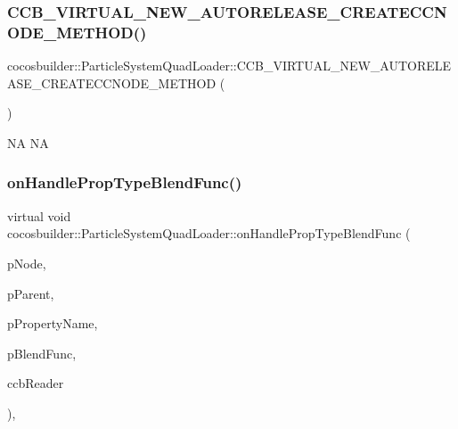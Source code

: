\subsubsection{\texorpdfstring{C\+C\+B\+\_\+\+V\+I\+R\+T\+U\+A\+L\+\_\+\+N\+E\+W\+\_\+\+A\+U\+T\+O\+R\+E\+L\+E\+A\+S\+E\+\_\+\+C\+R\+E\+A\+T\+E\+C\+C\+N\+O\+D\+E\+\_\+\+M\+E\+T\+H\+O\+D()}{CCB\_VIRTUAL\_NEW\_AUTORELEASE\_CREATECCNODE\_METHOD()}\hspace{0.1cm}{\footnotesize\ttfamily [2/2]}}
{\footnotesize\ttfamily cocosbuilder\+::\+Particle\+System\+Quad\+Loader\+::\+C\+C\+B\+\_\+\+V\+I\+R\+T\+U\+A\+L\+\_\+\+N\+E\+W\+\_\+\+A\+U\+T\+O\+R\+E\+L\+E\+A\+S\+E\+\_\+\+C\+R\+E\+A\+T\+E\+C\+C\+N\+O\+D\+E\+\_\+\+M\+E\+T\+H\+OD (\begin{DoxyParamCaption}\item[{cocos2d\+::\+Particle\+System\+Quad}]{ }\end{DoxyParamCaption})\hspace{0.3cm}{\ttfamily [protected]}}

NA  NA \mbox{\label{classcocosbuilder_1_1ParticleSystemQuadLoader_a9beea0b8c5da3ce78cbc214759273ddc}} 
\subsubsection{\texorpdfstring{on\+Handle\+Prop\+Type\+Blend\+Func()}{onHandlePropTypeBlendFunc()}\hspace{0.1cm}{\footnotesize\ttfamily [1/2]}}
{\footnotesize\ttfamily virtual void cocosbuilder\+::\+Particle\+System\+Quad\+Loader\+::on\+Handle\+Prop\+Type\+Blend\+Func (\begin{DoxyParamCaption}\item[{cocos2d\+::\+Node $\ast$}]{p\+Node,  }\item[{cocos2d\+::\+Node $\ast$}]{p\+Parent,  }\item[{const char $\ast$}]{p\+Property\+Name,  }\item[{cocos2d\+::\+Blend\+Func}]{p\+Blend\+Func,  }\item[{\hyperlink{classcocosbuilder_1_1CCBReader}{C\+C\+B\+Reader} $\ast$}]{ccb\+Reader }\end{DoxyParamCaption})\hspace{0.3cm}{\ttfamily [protected]}, {\ttfamily [virtual]}}

